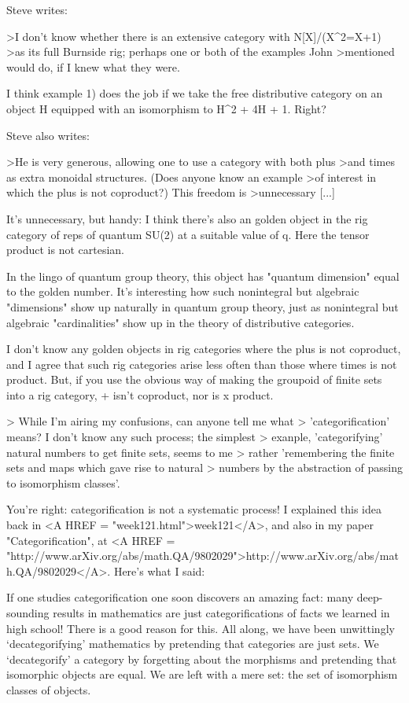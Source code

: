 Steve writes:

>I don't know whether there is an extensive category with N[X]/(X^2=X+1) 
>as its full Burnside rig; perhaps one or both of the examples John 
>mentioned would do, if I knew what they were.

I think example 1) does the job if we take the free distributive
category on an object H equipped with an isomorphism to H^2 + 4H + 1.
Right?

Steve also writes:

>He is very generous, allowing one to use a category with both plus 
>and times as extra monoidal structures.  (Does anyone know an example 
>of interest in which the plus is not coproduct?)  This freedom is 
>unnecessary [...]

It's unnecessary, but handy: I think there's also an golden object in 
the rig category of reps of quantum SU(2) at a suitable value of q.  
Here the tensor product is not cartesian.  

In the lingo of quantum group theory, this object has "quantum dimension"
equal to the golden number.  It's interesting how such nonintegral but 
algebraic "dimensions" show up naturally in quantum group theory, 
just as nonintegral but algebraic "cardinalities" show up in the theory 
of distributive categories.  

I don't know any golden objects in rig categories where the plus is
not coproduct, and I agree that such rig categories arise less often
than those where times is not product.  But, if you use the obvious 
way of making the groupoid of finite sets into a rig category, + isn't 
coproduct, nor is x product.  

> While I'm airing my confusions, can anyone tell me what
> 'categorification' means? I don't know any such process; the simplest
> exanple, 'categorifying' natural numbers to get finite sets, seems to me
> rather 'remembering the finite sets and maps which gave rise to natural
> numbers by the abstraction of passing to isomorphism classes'.

You're right: categorification is not a systematic process!  
I explained this idea back in <A HREF = "week121.html">week121</A>, and also in my paper
"Categorification", at <A HREF = "http://www.arXiv.org/abs/math.QA/9802029">http://www.arXiv.org/abs/math.QA/9802029</A>.  
Here's what I said:

 If one studies categorification one soon discovers an amazing fact: many
 deep-sounding results in mathematics are just categorifications of facts
 we learned in high school!  There is a good reason for this.  All along,
 we have been unwittingly `decategorifying' mathematics by pretending
 that categories are just sets.  We `decategorify' a category by
 forgetting about the morphisms and pretending that isomorphic objects
 are equal.  We are left with a mere set: the set of isomorphism classes
 of objects. 

